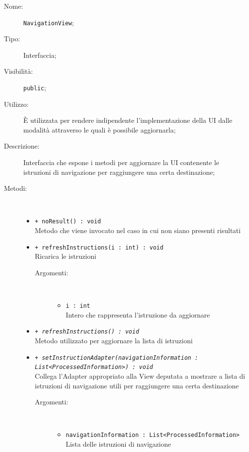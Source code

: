 \documentclass[../DefinizioneDiProdotto.tex]{subfiles}
\begin{document}
\begin{description}
	\item[Nome:] \texttt{NavigationView};
	\item[Tipo:] Interfaccia;
	\item[Visibilità:] \texttt{public};
	\item[Utilizzo:] È utilizzata per rendere indipendente l'implementazione della UI dalle modalità attraverso le quali è possibile aggiornarla;
	\item[Descrizione:] Interfaccia che espone i metodi per aggiornare la UI contenente le istruzioni di navigazione per raggiungere una certa destinazione;
	\item[Metodi:] \
	\begin{itemize}
		\item \texttt{+ noResult() : void}\\
		Metodo che viene invocato nel caso in cui non siano presenti risultati
		\item \texttt{+ refreshInstructions(i : int) : void}\\
		Ricarica le istruzioni
		\begin{description}
			\item[Argomenti:] \
			\begin{itemize}
				\item \texttt{i : int}\\
				Intero che rappresenta l'istruzione da aggiornare\end{itemize}
		\end{description}
		\item \texttt{+ \textit{refreshInstructions() : void}}\\
		Metodo utilizzato per aggiornare la lista di istruzioni 
		\item \texttt{+ \textit{setInstructionAdapter(navigationInformation :\\ List<ProcessedInformation>) : void}}\\
		Collega l'Adapter appropriato alla View deputata a mostrare a lista di istruzioni di navigazione utili per raggiungere una certa destinazione
		\begin{description}
			\item[Argomenti:] \
			\begin{itemize}
				\item \texttt{navigationInformation : List<ProcessedInformation>}\\
				Lista delle istruzioni di navigazione\end{itemize}
		\end{description}

\end{itemize}
\end{description}
\end{document}
